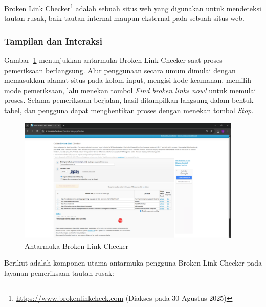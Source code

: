 Broken Link Checker\footnote{\url{https://www.brokenlinkcheck.com} (Diakses pada 30 Agustus 2025)} adalah sebuah situs web yang digunakan untuk mendeteksi tautan rusak, baik tautan internal maupun eksternal pada sebuah situs web.


\subsubsection*{Tampilan dan Interaksi}

Gambar~\ref{fig:analisis-brokenlinkchecker} menunjukkan antarmuka Broken Link Checker saat proses pemeriksaan berlangsung. Alur penggunaan secara umum dimulai dengan memasukkan alamat situs pada kolom input, mengisi kode keamanan, memilih mode pemeriksaan, lalu menekan tombol \textit{Find broken links now!} untuk memulai proses. Selama pemeriksaan berjalan, hasil ditampilkan langsung dalam bentuk tabel, dan pengguna dapat menghentikan proses dengan menekan tombol \textit{Stop}.

\begin{figure}[H]
    \centering
    \includegraphics[width=0.95\textwidth]{Gambar/030203-broken-link-checker.png}
    \caption{Antarmuka Broken Link Checker}
    \label{fig:analisis-brokenlinkchecker}
\end{figure}

Berikut adalah komponen utama antarmuka pengguna Broken Link Checker pada layanan pemeriksaan tautan rusak:

